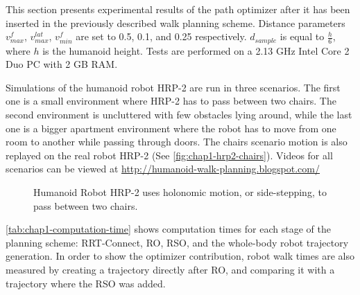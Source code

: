 This section presents experimental results of the path
optimizer after it has been inserted in the previously described walk
planning scheme. Distance parameters $v_{max}^f$,
$v_{max}^{lat}$, $v_{min}^f$ are set to 0.5, 0.1, and 0.25
respectively. $d_{sample}$ is equal to $\frac{h}{6}$, where $h$
is the humanoid height.  Tests are performed on a 2.13 GHz Intel Core
2 Duo PC with 2 GB RAM.

Simulations of the humanoid robot HRP-2 are run in three scenarios.
The first one is a small environment where HRP-2 has to pass between
two chairs. The second environment is uncluttered with few obstacles
lying around, while the last one is a bigger apartment environment
where the robot has to move from one room to another while passing
through doors. The chairs scenario motion is also replayed on the real
robot HRP-2 (See \autoref{fig:chap1-hrp2-chairs}). Videos for all scenarios
can be viewed at \url{http://humanoid-walk-planning.blogspot.com/}

\begin{figure}
  \caption{Humanoid Robot HRP-2 uses holonomic motion, or
    side-stepping, to pass between two chairs.}
  \label{fig:chap1-hrp2-chairs}
\end{figure}

\autoref{tab:chap1-computation-time} shows computation times for each stage
of the planning scheme: RRT-Connect, RO, RSO, and the whole-body robot
trajectory generation. In order to show the optimizer contribution,
robot walk times are also measured by creating a trajectory directly
after RO, and comparing it with a trajectory where the RSO was added.

